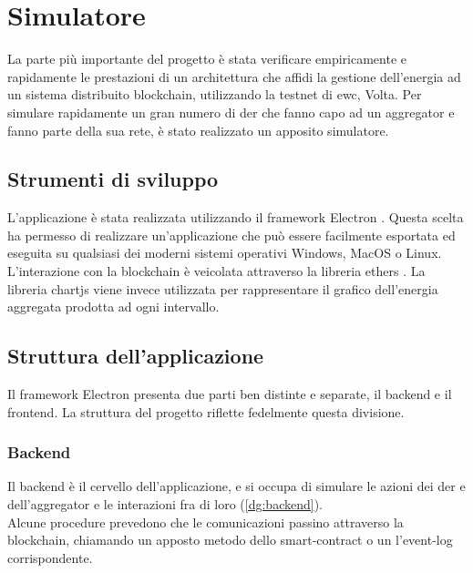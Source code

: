 \chapter{Simulatore}

La parte più importante del progetto è stata verificare empiricamente e rapidamente le prestazioni di un architettura
che affidi la gestione dell'energia ad un sistema distribuito \gls{blockchain}, utilizzando la testnet di \gls{ewc}, Volta.
Per simulare rapidamente un gran numero di \gls{der} che fanno capo ad un \gls{aggregator} e fanno parte della sua rete,
è stato realizzato un apposito simulatore.

\section{Strumenti di sviluppo}

L'applicazione è stata realizzata utilizzando il framework Electron \cite{sftw:electron}.
Questa scelta ha permesso di realizzare un'applicazione che può essere facilmente esportata ed eseguita su qualsiasi dei moderni sistemi operativi
Windows, MacOS o Linux.
L'interazione con la \gls{blockchain} è veicolata attraverso la libreria ethers \cite{sftw:ethers}.
La libreria chartjs \cite{sftw:chartjs} viene invece utilizzata per rappresentare il grafico dell'energia aggregata prodotta ad ogni intervallo.

\section{Struttura dell'applicazione}

Il framework Electron presenta due parti ben distinte e separate, il backend e il frontend.
La struttura del progetto riflette fedelmente questa divisione.

\subsection{Backend}

Il backend è il cervello dell'applicazione, e si occupa di simulare le azioni dei \gls{der} e dell'\gls{aggregator} e le interazioni fra di loro (\autoref{dg:backend}). \\
Alcune procedure prevedono che le comunicazioni passino attraverso la \gls{blockchain},
chiamando un apposto metodo dello \gls{smart-contract} o un l'\gls{event-log} corrispondente.



